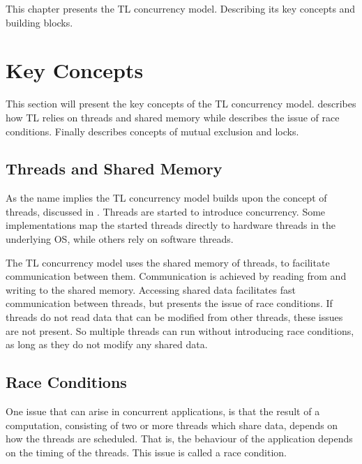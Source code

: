 \makeatletter {}\makeatother
{}
This chapter presents the \ac{TL} concurrency model. Describing its key concepts and building blocks.
\label{chap:threads_locks}
\section{Key Concepts}
This section will present the key concepts of the \ac{TL} concurrency model.  describes how \ac{TL} relies on threads and shared memory while  describes the issue of race conditions. Finally  describes concepts of mutual exclusion and locks.
\subsection{Threads and Shared Memory}\label{subsec:threads_shared_memory}
As the name implies the \ac{TL} concurrency model builds upon the concept of threads, discussed in . Threads are started to introduce concurrency. Some implementations map the started threads directly to hardware threads in the underlying \ac{OS}, while others rely on software threads.

The \ac{TL} concurrency model uses the shared memory of threads, to facilitate communication between them. Communication is achieved by reading from and writing to the shared memory\cite[p. 93]{tanenbaum2008modern}. Accessing shared data facilitates fast communication between threads, but presents the issue of race conditions. If threads do not read data that can be modified from other threads, these issues are not present. So multiple threads can run without introducing race conditions, as long as they do not modify any shared data.

\subsection{Race Conditions}\label{subsec:race_coditions}
One issue that can arise in concurrent applications, is that the result of a computation, consisting of two or more threads which share data, depends on how the threads are scheduled. That is, the behaviour of the application depends on the timing of the threads. This issue is called a race condition\cite[p. 983]{bryant2011computer}\cite[p. 115]{tanenbaum2008modern}\cite[p. 44]{sevenModels}.

